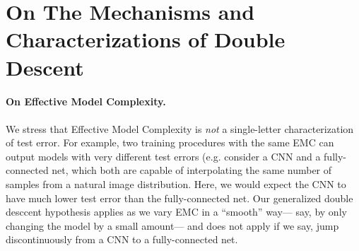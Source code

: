 \section{On The Mechanisms and Characterizations of Double Descent}
\label{sec:morediscuss}

\paragraph{On Effective Model Complexity.}
We stress that Effective Model Complexity is \emph{not} a single-letter characterization
of test error.
For example, two training procedures with the same EMC can output models with
very different test errors (e.g. consider a CNN and a fully-connected net, which both are capable of interpolating the same number of samples from a natural image distribution.
Here, we would expect the CNN to have much lower test error than the fully-connected net.
Our generalized double desccent hypothesis applies as we vary EMC in a ``smooth'' way--- say, by only
changing the model by a small amount--- and does not apply if we say, jump discontinuously from a CNN to a fully-connected net.